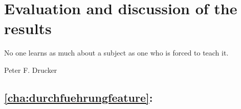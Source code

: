 \chapter{Evaluation and discussion of the results}
\label{cha:results}

\epigraph{No one learns as much about a subject as one who is forced to teach it.}{Peter F. Drucker}

\section{\autoref{cha:durchfuehrungfeature}: }

\lipsum[3]

\newcommand{\specialcell}[2][c]{%
\begin{tabular}[#1]{@{}c@{}}#2\end{tabular}}

